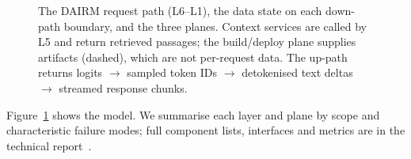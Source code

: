 \documentclass[11pt]{article}
\begin{document}
\begin{figure}[!htbp]
\caption{The DAIRM request path (L6--L1), the data state on each down-path boundary, and the three planes. Context services are called by L5 and return retrieved passages; the build/deploy plane supplies artifacts (dashed), which are not per-request data. The up-path returns logits $\rightarrow$ sampled token IDs $\rightarrow$ detokenised text deltas $\rightarrow$ streamed response chunks.}
\label{fig:stack}
\end{figure}

Figure~\ref{fig:stack} shows the model. We summarise each layer and plane by scope and characteristic failure modes; full component lists, interfaces and metrics are in the technical report~\cite{bhatt2026dairm}.
\end{document}
